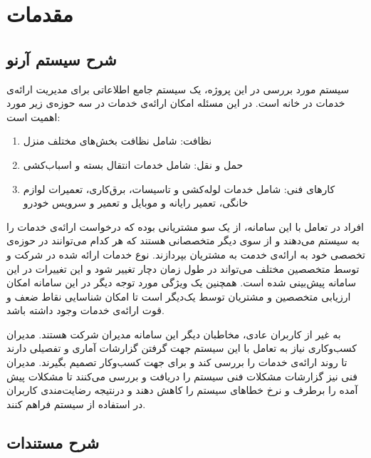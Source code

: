 
\chapter{مقدمات}

\section{شرح سیستم آرنو}

سیستم مورد بررسی در این پروژه، ‌یک سیستم جامع اطلاعاتی برای مدیریت ارائه‌ی خدمات در خانه است. 
در این مسئله امکان ارائه‌ی خدمات در سه حوزه‌ی زیر مورد اهمیت است:

\begin{enumerate}
\item
نظافت: شامل نظافت بخش‌های مختلف منزل 
\item
حمل و نقل: شامل خدمات انتقال بسته و اسباب‌کشی
\item 
کارهای فنی: شامل خدمات لوله‌کشی و تاسیسات، برق‌کاری، تعمیرات لوازم خانگی، تعمیر رایانه و موبایل و تعمیر و سرویس خودرو

\end{enumerate}

افراد در تعامل با این سامانه، از یک سو مشتریانی بوده که درخواست ارائه‌ی خدمات را به سیستم می‌دهند و از سوی دیگر متخصصانی هستند که هر کدام می‌توانند در حوزه‌ی تخصصی خود به ارائه‌ی خدمت به مشتریان بپردازند. نوع خدمات ارائه شده در شرکت و توسط متخصصین مختلف می‌تواند در طول زمان دچار تغییر شود و این تغییرات در این سامانه پیش‌بینی شده است. همچنین یک ویژگی مورد توجه دیگر در این سامانه امکان ارزیابی متخصصین و مشتریان توسط یک‌دیگر است تا امکان شناسایی نقاط ضعف و قوت ارائه‌ی خدمات وجود داشته باشد.

به غیر از کاربران عادی، مخاطبان دیگر این سامانه مدیران شرکت هستند. مدیران کسب‌وکاری نیاز به تعامل با این سیستم جهت گرفتن گزارشات آماری و تفصیلی دارند تا روند ارائه‌ی خدمات را بررسی کند و برای جهت کسب‌و‌کار تصمیم بگیرند. مدیران فنی نیز گزارشات مشکلات فنی سیستم را دریافت و بررسی می‌کنند تا مشکلات پیش آمده را برطرف و نرخ خطاهای سیستم را کاهش دهند و درنتیجه رضایت‌مندی کاربران در استفاده از سیستم فراهم کنند.


\section{شرح مستندات}


